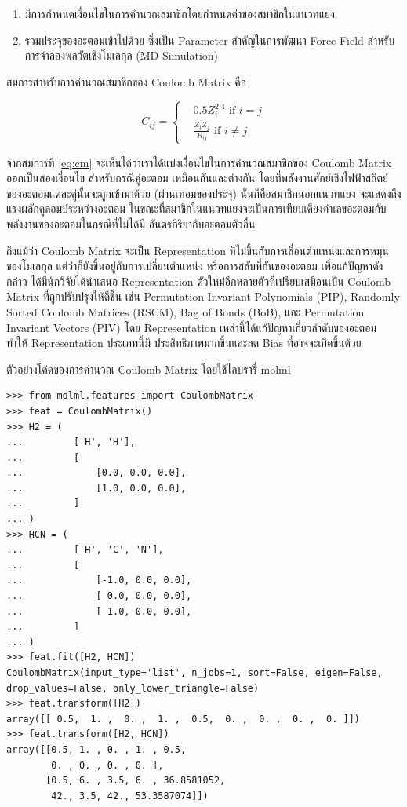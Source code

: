 \begin{enumerate}
    \item มีการกำหนดเงื่อนไขในการคำนวณสมาชิกโดยกำหนดค่าของสมาชิกในแนวทแยง
    
    \item รวมประจุของอะตอมเข้าไปด้วย ซึ่งเป็น Parameter สำคัญในการพัฒนา Force Field สำหรับการจำลองพลวัตเชิงโมเลกุล (MD Simulation)
\end{enumerate}

สมการสำหรับการคำนวณสมาชิกของ Coulomb Matrix คือ

\begin{equation}
    \label{eq:cm}
    C_{ij} =
    \begin{cases}
     & 0.5 Z_i^{2.4} \text{ if } i = j \\ 
     & \frac{Z_i Z_j}{R_{ij}} \text{ if } i \neq j
    \end{cases}
\end{equation}

จากสมการที่ \ref{eq:cm} จะเห็นได้ว่าเราได้แบ่งเงื่อนไขในการคำนวณสมาชิกของ Coulomb Matrix ออกเป็นสองเงื่อนไข สำหรับกรณีคู่อะตอม%
เหมือนกันและต่างกัน โดยที่พลังงานศักย์เชิงไฟฟ้าสถิตย์ของอะตอมแต่ละคู่นั้นจะถูกเข้ามาด้วย (ผ่านเทอมของประจุ) นั่นก็คือสมาชิกนอกแนวทแยง%
จะแสดงถึงแรงผลักคูลอมบ์ระหว่างอะตอม ในขณะที่สมาชิกในแนวทแยงจะเป็นการเทียบเคียงค่าเลขอะตอมกับพลังงานของอะตอมในกรณีที่ไม่ได้มี%
อันตรกิริยากับอะตอมตัวอื่น

ถึงแม้ว่า Coulomb Matrix จะเป็น Representation ที่ไม่ขึ้นกับการเลื่อนตำแหน่งและการหมุนของโมเลกุล แต่ว่าก็ยังขึ้นอยู่กับการเปลี่ยนตำแหน่ง%
หรือการสลับที่กันของอะตอม เพื่อแก้ปัญหาดังกล่าว ได้มีนักวิจัยได้นำเสนอ Representation ตัวใหม่อีกหลายตัวที่เปรียบเสมือนเป็น Coulomb Matrix 
ที่ถูกปรับปรุงให้ดีขึ้น เช่น Permutation-Invariant Polynomials (PIP)\autocite{braams2009}, Randomly Sorted Coulomb Matrices 
(RSCM)\autocite{hansen2013}, Bag of Bonds (BoB)\autocite{hansen2013}, และ Permutation Invariant Vectors 
(PIV)\autocite{gallet2013} โดย Representation เหล่านี้ได้แก้ปัญหาเกี่ยวลำดับของอะตอม ทำให้ Representation ประเภทนี้มี%
ประสิทธิภาพมากขึ้นและลด Bias ที่อาจจะเกิดขึ้นด้วย

ตัวอย่างโค้ดของการคำนวณ Coulomb Matrix โดยใช้ไลบรารี่ molml\autocite{collins2018}

\begin{lstlisting}[style=MyPython]
>>> from molml.features import CoulombMatrix
>>> feat = CoulombMatrix()
>>> H2 = (
...         ['H', 'H'],
...         [
...             [0.0, 0.0, 0.0],
...             [1.0, 0.0, 0.0],
...         ]
... )
>>> HCN = (
...         ['H', 'C', 'N'],
...         [
...             [-1.0, 0.0, 0.0],
...             [ 0.0, 0.0, 0.0],
...             [ 1.0, 0.0, 0.0],
...         ]
... )
>>> feat.fit([H2, HCN])
CoulombMatrix(input_type='list', n_jobs=1, sort=False, eigen=False, drop_values=False, only_lower_triangle=False)
>>> feat.transform([H2])
array([[ 0.5,  1. ,  0. ,  1. ,  0.5,  0. ,  0. ,  0. ,  0. ]])
>>> feat.transform([H2, HCN])
array([[0.5, 1. , 0. , 1. , 0.5,
        0. , 0. , 0. , 0. ],
       [0.5, 6. , 3.5, 6. , 36.8581052,
        42., 3.5, 42., 53.3587074]])
\end{lstlisting}

